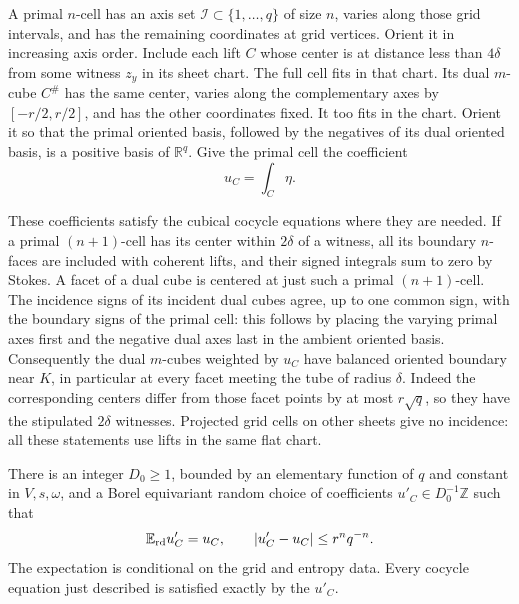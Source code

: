 A primal \(n\)-cell has an axis set \(\mathcal I\subset\{1,\ldots,q\}\)
of size \(n\), varies along those grid intervals, and has the remaining
coordinates at grid vertices.  Orient it in increasing axis order.
Include each lift \(C\) whose center is at distance less than \(4\delta\)
from some witness \(z_y\) in its sheet chart.  The full cell fits in that
chart.  Its dual \(m\)-cube \(C^\#\) has the same center, varies along
the complementary axes by \([-r/2,r/2]\), and has the other coordinates
fixed.  It too fits in the chart.  Orient it so that the primal oriented
basis, followed by the negatives of its dual oriented basis, is a
positive basis of \(\mathbb R^q\).  Give the primal cell the coefficient
\begin{equation}\label{eq:transfer-cell-value}
                              u_C=\int_C\eta.
\end{equation}

These coefficients satisfy the cubical cocycle equations where they
are needed.  If a primal \((n+1)\)-cell has its center within
\(2\delta\) of a witness, all its boundary \(n\)-faces are included
with coherent lifts, and their signed integrals sum to zero by Stokes.
A facet of a dual cube is centered at just such a primal
\((n+1)\)-cell.  The incidence signs of its incident dual cubes agree,
up to one common sign, with the boundary signs of the primal cell:
this follows by placing the varying primal axes first and the negative
dual axes last in the ambient oriented basis.  Consequently the dual
\(m\)-cubes weighted by \(u_C\) have balanced oriented boundary near
\(K\), in particular at every facet meeting the tube of radius
\(\delta\).  Indeed the corresponding centers differ from those
facet points by at most \(r\sqrt q\), so they have the stipulated
\(2\delta\) witnesses.  Projected grid cells on other sheets give no
incidence: all these statements use lifts in the same flat chart.

\begin{lemma}\label{lem:transfer-rounding}
There is an integer \(D_0\geq1\), bounded by an elementary function of
\(q\) and constant in \(V,s,\omega\), and a Borel equivariant random
choice of coefficients \(u'_C\in D_0^{-1}\mathbb Z\) such that
\begin{equation}\label{eq:transfer-rounding}
 \mathbb E_{\rm rd}u'_C=u_C,\qquad |u'_C-u_C|\leq r^nq^{-n}.
\end{equation}
The expectation is conditional on the grid and entropy data.  Every
cocycle equation just described is satisfied exactly by the \(u'_C\).
\end{lemma}

